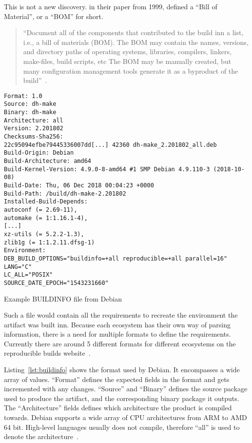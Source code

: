 \documentclass[../Main/thesis.tex]{subfiles}
\begin{document}
This is not a new discovery. \citeauthor{software-reconstruction-1999} in their
paper  from 1999, defined a ``Bill
of Material'', or a ``BOM'' for short.

\begin{quotation}
``Document all of the components that contributed to the build inn a list, i.e.,
a bill of materials (BOM). The BOM may contain the names, versions, and
directory paths of operating systems, libraries, compilers, linkers, make-files,
build scripts, etc The BOM may be manually created, but many configuration
management tools generate it as a byproduct of the build''~\cite{software-reconstruction-1999}.
\end{quotation}

\begin{listing}[H]
\begin{verbatim}
Format: 1.0
Source: dh-make
Binary: dh-make
Architecture: all
Version: 2.201802
Checksums-Sha256:
22c95094efbe79445336007dd[...] 42360 dh-make_2.201802_all.deb
Build-Origin: Debian
Build-Architecture: amd64
Build-Kernel-Version: 4.9.0-8-amd64 #1 SMP Debian 4.9.110-3 (2018-10-08)
Build-Date: Thu, 06 Dec 2018 00:04:23 +0000
Build-Path: /build/dh-make-2.201802
Installed-Build-Depends:
autoconf (= 2.69-11),
automake (= 1:1.16.1-4),
[...]
xz-utils (= 5.2.2-1.3),
zlib1g (= 1:1.2.11.dfsg-1)
Environment:
DEB_BUILD_OPTIONS="buildinfo=+all reproducible=+all parallel=16"
LANG="C"
LC_ALL="POSIX"
SOURCE_DATE_EPOCH="1543231660"
\end{verbatim}
\caption{Example BUILDINFO file from Debian}
\label{lst:buildinfo}
\end{listing}

Such a file would contain all the requirements to recreate the environment the
artifact was built inn. Because each ecosystem has their own way of parsing
information, there is a need for multiple formats to define the requirements.
Currently there are around 5 different formats for different ecosystems on the
reproducible builds website~\cite{reproducible-builds-2019}.

Listing~\ref{lst:buildinfo} shows the format used by Debian. It encompasses a
wide array of values. ``Format'' defines the expected fields in the format and
gets incremented with any changes.  ``Source'' and ``Binary'' defines the source
package used to produce the artifact, and the corresponding binary package it
outputs. The ``Architecture'' fields defines which architecture the product is
compiled towards. Debian supports a wide array of CPU architectures from ARM to
AMD 64 bit. High-level languages usually does not compile, therefore ``all'' is
used to denote the architecture~\cite{deb-buildinfo}.
\end{document}
